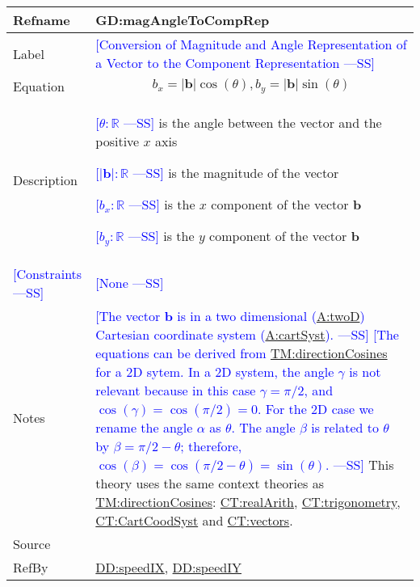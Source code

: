 \documentclass[12pt]{article}
\newcommand{\authornote}[3]{\textcolor{#1}{[#3 ---#2]}}
\newcommand{\authornote}[3]{}
\newcommand{\wss}[1]{\authornote{blue}{SS}{#1}}
\begin{document}
\medskip
\noindent
\begin{minipage}{\textwidth}
\begin{tabular}{>{\raggedright}p{}>{\raggedright\arraybackslash}p{}}
\toprule \textbf{Refname} & \textbf{GD:magAngleToCompRep}
\label{GD:magAngleToCompRep}
\\ \midrule
Label & \wss{Conversion of Magnitude and Angle Representation of a Vector to the
Component Representation}
        
\\ \midrule
Equation & \begin{displaymath}
           b_x = |\symbf{b}| \cos (\theta), b_y = |\symbf{b}| \sin (\theta)
           \end{displaymath}
\\ \midrule
Description & \begin{symbDescription}
              \item \wss{$\theta: \mathbb{R}$} is the angle between the vector and the positive $x$ axis 
              \item \wss{$|\symbf{b}|: \mathbb{R}$} is the magnitude of the vector
              \item \wss{$b_x: \mathbb{R}$} is the $x$ component of the vector $\symbf{b}$
              \item \wss{$b_y: \mathbb{R}$} is the $y$ component of the vector $\symbf{b}$
              \end{symbDescription}

\\ \midrule
\wss{Constraints} & \wss{None}

\\ \midrule
Notes & \wss{The vector $\symbf{b}$ is in a two dimensional
(\hyperref[twoD]{A:twoD}) Cartesian coordinate system
(\hyperref[cartSyst]{A:cartSyst}).} \wss{The equations can be derived from
\hyperref[TM:directionCosines]{TM:directionCosines} for a 2D sytem.  In a 2D system,
the angle $\gamma$ is not relevant because in this case $\gamma = \pi/2$, and 
$\cos(\gamma) = \cos(\pi/2) = 0$.  For the 2D case we rename the angle $\alpha$
as $\theta$.  The angle $\beta$ is related to $\theta$ by $\beta = \pi/2 -
\theta$; therefore, $\cos(\beta) = \cos(\pi/2 - \theta) = \sin(\theta)$.}  This theory uses the same context theories as \hyperref[TM:directionCosines]{TM:directionCosines}: \hyperref[CT:realArith]{CT:realArith}, \hyperref[CT:trigonometry]{CT:trigonometry}, \hyperref[CT:CartCoordSyst]{CT:CartCoodSyst} and \hyperref[CT:vectors]{CT:vectors}.

\\ \midrule
Source & \cite{}
         
\\ \midrule
RefBy & \hyperref[DD:speedIX]{DD:speedIX}, \hyperref[DD:speedIY]{DD:speedIY}
        
\\ \bottomrule
\end{tabular}
\end{minipage}
\end{document}
